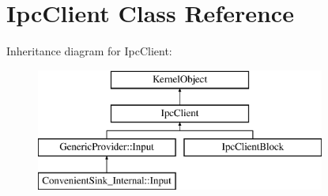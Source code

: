 \hypertarget{class_ipc_client}{}\section{Ipc\+Client Class Reference}
\label{class_ipc_client}
Inheritance diagram for Ipc\+Client\+:\begin{figure}[H]
\begin{center}
\leavevmode
\includegraphics[height=4.000000cm]{class_ipc_client}
\end{center}
\end{figure}
